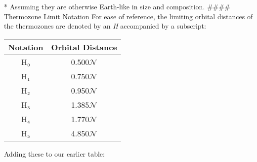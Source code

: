 \documentclass[
  letterpaper,
]{book}
\begin{document}
* Assuming they are otherwise Earth-like in size and composition.
\#\#\#\# Thermozone Limit Notation For ease of reference, the limiting
orbital distances of the thermozones are denoted by an \emph{H}
accompanied by a subscript:

\begin{longtable}[]{@{}cc@{}}
\toprule\noalign{}
Notation & Orbital Distance \\
\midrule\noalign{}
\endhead
\bottomrule\noalign{}
\endlastfoot
H₀ & 0.500\(\mathcal{N}\) \\
H₁ & 0.750\(\mathcal{N}\) \\
H₂ & 0.950\(\mathcal{N}\) \\
H₃ & 1.385\(\mathcal{N}\) \\
H₄ & 1.770\(\mathcal{N}\) \\
H₅ & 4.850\(\mathcal{N}\) \\
\end{longtable}

Adding these to our earlier table:
\end{document}
